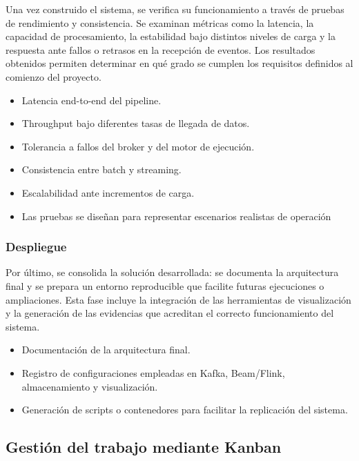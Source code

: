 \documentclass[12pt,a4paper]{article}
\providecommand{\tightlist}{%
  \setlength{\itemsep}{0pt}\setlength{\parskip}{0pt}}
\begin{document}
Una vez construido el sistema, se verifica su funcionamiento a través de pruebas de rendimiento y consistencia. Se examinan métricas como la latencia, la capacidad de procesamiento, la estabilidad bajo distintos niveles de carga y la respuesta ante fallos o retrasos en la recepción de eventos. Los resultados obtenidos permiten determinar en qué grado se cumplen los requisitos definidos al comienzo del proyecto.

\begin{itemize}
    \tightlist
    \item
          Latencia end-to-end del pipeline.
    \item
          Throughput bajo diferentes tasas de llegada de datos.
    \item
          Tolerancia a fallos del broker y del motor de ejecución.
    \item
          Consistencia entre batch y streaming.
    \item
          Escalabilidad ante incrementos de carga.
    \item
          Las pruebas se diseñan para representar escenarios realistas de operación
\end{itemize}

\subsubsection{\texorpdfstring{Despliegue}{Despliegue}}\label{despliegue}

Por último, se consolida la solución desarrollada: se documenta la arquitectura final y se prepara un entorno reproducible que facilite futuras ejecuciones o ampliaciones. Esta fase incluye la integración de las herramientas de visualización y la generación de las evidencias que acreditan el correcto funcionamiento del sistema.

\begin{itemize}
    \tightlist
    \item
          Documentación de la arquitectura final.
    \item
          Registro de configuraciones empleadas en Kafka, Beam/Flink, almacenamiento y visualización.
    \item
          Generación de scripts o contenedores para facilitar la replicación del sistema.
\end{itemize}

\subsection{Gestión del trabajo mediante Kanban}
\end{document}
